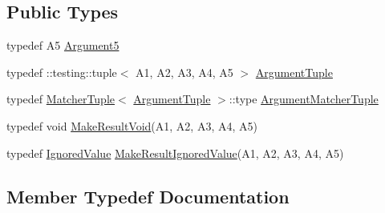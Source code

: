\subsection*{Public Types}
\begin{DoxyCompactItemize}
\item 
typedef A5 \mbox{\hyperlink{structtesting_1_1internal_1_1_function_3_01_r_07_a1_00_01_a2_00_01_a3_00_01_a4_00_01_a5_08_4_a5bc0279c43aa98c409219dee1b815c71}{Argument5}}
\item 
typedef \+::testing\+::tuple$<$ A1, A2, A3, A4, A5 $>$ \mbox{\hyperlink{structtesting_1_1internal_1_1_function_3_01_r_07_a1_00_01_a2_00_01_a3_00_01_a4_00_01_a5_08_4_af5a1487829347eae2a48b2f66f216f52}{Argument\+Tuple}}
\item 
typedef \mbox{\hyperlink{structtesting_1_1internal_1_1_matcher_tuple}{Matcher\+Tuple}}$<$ \mbox{\hyperlink{structtesting_1_1internal_1_1_function_3_01_r_07_08_4_ad483c3128c470d8cdb55c3ac1c575c11}{Argument\+Tuple}} $>$\+::type \mbox{\hyperlink{structtesting_1_1internal_1_1_function_3_01_r_07_a1_00_01_a2_00_01_a3_00_01_a4_00_01_a5_08_4_a03c18380538e53141227afe6d0f20cc8}{Argument\+Matcher\+Tuple}}
\item 
typedef void \mbox{\hyperlink{structtesting_1_1internal_1_1_function_3_01_r_07_a1_00_01_a2_00_01_a3_00_01_a4_00_01_a5_08_4_a2903acde18de33d756eef4d43d843c04}{Make\+Result\+Void}}(A1, A2, A3, A4, A5)
\item 
typedef \mbox{\hyperlink{classtesting_1_1internal_1_1_ignored_value}{Ignored\+Value}} \mbox{\hyperlink{structtesting_1_1internal_1_1_function_3_01_r_07_a1_00_01_a2_00_01_a3_00_01_a4_00_01_a5_08_4_a552ce4ec27e2d09fa1c133c66f72d7b3}{Make\+Result\+Ignored\+Value}}(A1, A2, A3, A4, A5)
\end{DoxyCompactItemize}


\subsection{Member Typedef Documentation}
\mbox{\label{structtesting_1_1internal_1_1_function_3_01_r_07_a1_00_01_a2_00_01_a3_00_01_a4_00_01_a5_08_4_a5bc0279c43aa98c409219dee1b815c71}} 
